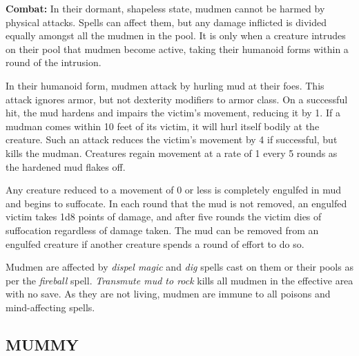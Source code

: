 \begin{multicols}{2}
\textbf{Combat:} In their dormant, shapeless state, mudmen cannot be harmed by physical attacks. Spells can affect them, but any damage inflicted is divided equally amongst all the mudmen in the pool. It is only when a creature intrudes on their pool that mudmen become active, taking their humanoid forms within a round of the intrusion.

In their humanoid form, mudmen attack by hurling mud at their foes. This attack ignores armor, but not dexterity modifiers to armor class. On a successful hit, the mud hardens and impairs the victim's movement, reducing it by 1. If a mudman comes within 10 feet of its victim, it will hurl itself bodily at the creature. Such an attack reduces the victim's movement by 4 if successful, but kills the mudman. Creatures regain movement at a rate of 1 every 5 rounds as the hardened mud flakes off.

Any creature reduced to a movement of 0 or less is completely engulfed in mud and begins to suffocate. In each round that the mud is not removed, an engulfed victim takes 1d8 points of damage, and after five rounds the victim dies of suffocation regardless of damage taken. The mud can be removed from an engulfed creature if another creature spends a round of effort to do so. 

Mudmen are affected by \textit{dispel magic} and \textit{dig} spells cast on them or their pools as per the \textit{fireball} spell. \textit{Transmute mud to rock} kills all mudmen in the effective area with no save. As they are not living, mudmen are immune to all poisons and mind-affecting spells.

\noindent
\begin{minipage}{\columnwidth}

\vspace{1em}

\subsection{MUMMY}


\end{minipage}
\end{multicols}
